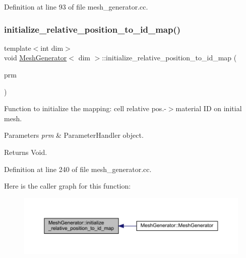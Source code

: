 Definition at line 93 of file mesh\+\_\+generator.\+cc.

\mbox{\label{class_mesh_generator_a6d216567b5b599cee526f33d435e6655}} 
\subsubsection{\texorpdfstring{initialize\+\_\+relative\+\_\+position\+\_\+to\+\_\+id\+\_\+map()}{initialize\_relative\_position\_to\_id\_map()}}
{\footnotesize\ttfamily template$<$int dim$>$ \\
void \hyperlink{class_mesh_generator}{Mesh\+Generator}$<$ dim $>$\+::initialize\+\_\+relative\+\_\+position\+\_\+to\+\_\+id\+\_\+map (\begin{DoxyParamCaption}\item[{Parameter\+Handler \&}]{prm }\end{DoxyParamCaption})\hspace{0.3cm}{\ttfamily [private]}}

Function to initialize the mapping\+: cell relative pos.-\/$>$material ID on initial mesh.


\begin{DoxyParams}{Parameters}
{\em prm} & Parameter\+Handler object. \\
\hline
\end{DoxyParams}
\begin{DoxyReturn}{Returns}
Void. 
\end{DoxyReturn}


Definition at line 240 of file mesh\+\_\+generator.\+cc.

Here is the caller graph for this function\+:\nopagebreak
\begin{figure}[H]
\begin{center}
\leavevmode
\includegraphics[width=350pt]{class_mesh_generator_a6d216567b5b599cee526f33d435e6655_icgraph}
\end{center}
\end{figure}
\mbox{\label{class_mesh_generator_a27c6ff0b0c51700373ef9a1dc10abaaf}} 
